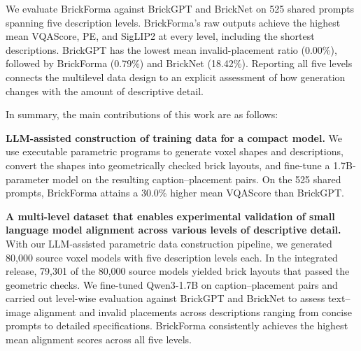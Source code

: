 We evaluate BrickForma against BrickGPT and BrickNet on 525 shared prompts spanning five description levels. BrickForma's raw outputs achieve the highest mean VQAScore, PE, and SigLIP2 at every level, including the shortest descriptions. BrickGPT has the lowest mean invalid-placement ratio (0.00\%), followed by BrickForma (0.79\%) and BrickNet (18.42\%). Reporting all five levels connects the multilevel data design to an explicit assessment of how generation changes with the amount of descriptive detail.

In summary, the main contributions of this work are as follows:

\textbf{LLM-assisted construction of training data for a compact model.}
We use executable parametric programs to generate voxel shapes and descriptions, convert the shapes into geometrically checked brick layouts, and fine-tune a 1.7B-parameter model on the resulting caption--placement pairs.
On the 525 shared prompts, BrickForma attains a 30.0\% higher mean VQAScore
than BrickGPT.



\textbf{A multi-level dataset that enables experimental validation of small language model alignment across 
various levels of descriptive detail.}
With our LLM-assisted parametric data construction pipeline, we generated 80,000 
source voxel models with five description levels each. In the integrated release, 79,301 of the 80,000 source models yielded brick layouts that passed the geometric checks. We fine-tuned Qwen3-1.7B on caption--placement pairs and carried out level-wise evaluation 
against BrickGPT and BrickNet to assess text--image alignment and invalid 
placements across descriptions ranging from concise prompts to detailed 
specifications. BrickForma consistently achieves the highest mean 
alignment scores across all five levels.